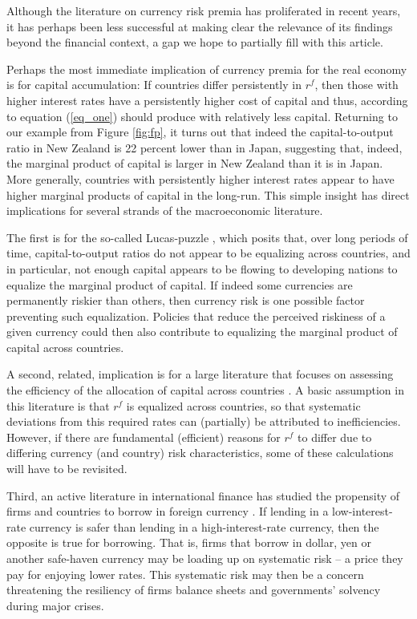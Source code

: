 Although the literature on currency risk premia has proliferated in
recent years, it has perhaps been less successful at making clear the
relevance of its findings beyond the financial context, a gap we hope
to partially fill with this article.

Perhaps the most immediate implication of currency premia for the real
economy is for capital accumulation: If countries differ persistently
in $r^f$, then those with higher interest rates have a persistently
higher cost of capital and thus, according to equation (\ref{eq_one}) 
should produce with relatively less capital. Returning to our example from
Figure \ref{fig:fp}, it turns out that indeed the capital-to-output
ratio in New Zealand is 22 percent lower than in Japan, suggesting
that, indeed, the marginal product of capital is larger in New Zealand
than it is in Japan. More generally, countries with persistently
higher interest rates appear to have higher marginal products of
capital in the long-run. This simple insight has direct implications
for several strands of the macroeconomic literature.

The first is for the so-called Lucas-puzzle \citep{Lucas1990}, which
posits that, over long periods of time, capital-to-output ratios do
not appear to be equalizing across countries, and in particular, not
enough capital appears to be flowing to developing nations to equalize
the marginal product of capital. If indeed some currencies are
permanently riskier than others, then currency risk is one possible
factor preventing such equalization. Policies that reduce the perceived riskiness of a given currency could then also contribute to equalizing the marginal product of capital across countries.

A second, related, implication is for a large literature that focuses
on assessing the efficiency of the allocation of capital across
countries \citep{HallJones1997, CaselliFeyrer2007}. A basic assumption
in this literature is that $r^f$ is equalized across countries, so
that systematic deviations from this required rates can (partially) be
attributed to inefficiencies. However, if there are fundamental
(efficient) reasons for $r^f$ to differ due to differing currency (and
country) risk characteristics, some of these calculations will have to
be revisited.

Third, an active literature in international finance has studied the
propensity of firms and countries to borrow in foreign currency
\citep{DuSchreger2016, KalemliOzcanetal2019}. If lending in a
low-interest-rate currency is safer than lending in a
high-interest-rate currency, then the opposite is true for borrowing.
That is, firms that borrow in dollar, yen or another safe-haven
currency may be loading up on systematic risk -- a price they pay for
enjoying lower rates. This systematic risk may then be a concern threatening the resiliency of firms balance sheets and governments' solvency during major crises.

